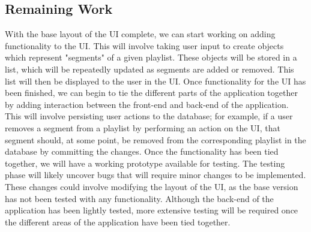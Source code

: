 \documentclass{article}
\begin{document}
\subsection{Remaining Work}
With the base layout of the UI complete, we can start working on adding functionality to the UI. This will involve taking user input to create objects which represent "segments" of a given playlist. These objects will be stored in a list, which will be repeatedly updated as segments are added or removed. This list will then be displayed to the user in the UI. Once functionality for the UI has been finished, we can begin to tie the different parts of the application together by adding interaction between the front-end and back-end of the application. This will involve persisting user actions to the database; for example, if a user removes a segment from a playlist by performing an action on the UI, that segment should, at some point, be removed from the corresponding playlist in the database by committing the changes. Once the functionality has been tied together, we will have a working prototype available for testing. The testing phase will likely uncover bugs that will require minor changes to be implemented. These changes could involve modifying the layout of the UI, as the base version has not been tested with any functionality. Although the back-end of the application has been lightly tested, more extensive testing will be required once the different areas of the application have been tied together.
\end{document}
